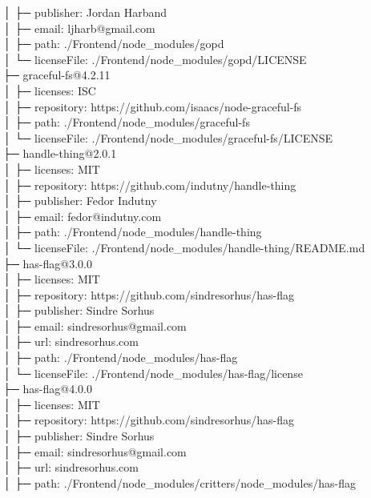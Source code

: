\documentclass[
    paper=a4,
    twoside=false,
    parskip=half,
    listof=entryprefix,
    listof=totoc,
    index=totoc,
    bibliography=totoc,
    headsepline,
]{scrbook}
\begin{document}
    │  ├─ publisher: Jordan Harband\\
    │  ├─ email: ljharb@gmail.com\\
    │  ├─ path: ./Frontend/node\_modules/gopd\\
    │  └─ licenseFile: ./Frontend/node\_modules/gopd/LICENSE\\
    ├─ graceful-fs@4.2.11\\
    │  ├─ licenses: ISC\\
    │  ├─ repository: https://github.com/isaacs/node-graceful-fs\\
    │  ├─ path: ./Frontend/node\_modules/graceful-fs\\
    │  └─ licenseFile: ./Frontend/node\_modules/graceful-fs/LICENSE\\
    ├─ handle-thing@2.0.1\\
    │  ├─ licenses: MIT\\
    │  ├─ repository: https://github.com/indutny/handle-thing\\
    │  ├─ publisher: Fedor Indutny\\
    │  ├─ email: fedor@indutny.com\\
    │  ├─ path: ./Frontend/node\_modules/handle-thing\\
    │  └─ licenseFile: ./Frontend/node\_modules/handle-thing/README.md\\
    ├─ has-flag@3.0.0\\
    │  ├─ licenses: MIT\\
    │  ├─ repository: https://github.com/sindresorhus/has-flag\\
    │  ├─ publisher: Sindre Sorhus\\
    │  ├─ email: sindresorhus@gmail.com\\
    │  ├─ url: sindresorhus.com\\
    │  ├─ path: ./Frontend/node\_modules/has-flag\\
    │  └─ licenseFile: ./Frontend/node\_modules/has-flag/license\\
    ├─ has-flag@4.0.0\\
    │  ├─ licenses: MIT\\
    │  ├─ repository: https://github.com/sindresorhus/has-flag\\
    │  ├─ publisher: Sindre Sorhus\\
    │  ├─ email: sindresorhus@gmail.com\\
    │  ├─ url: sindresorhus.com\\
    │  ├─ path: ./Frontend/node\_modules/critters/node\_modules/has-flag\\
\end{document}
